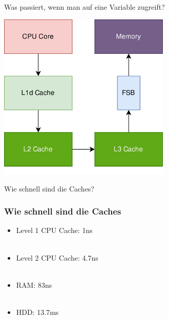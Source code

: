 \documentclass{beamer}
\begin{document}
%
\begin{frame}{Was passiert, wenn man auf eine Variable zugreift?}
\vspace*{0.5cm}
\centerline{\includegraphics[height=8cm]{trace6.png}}
\end{frame}

\begin{frame}
\centering
\Huge
    Wie schnell sind die Caches?
\end{frame}


\begin{frame}
\frametitle{Wie schnell sind die Caches}
\begin{itemize}
    \item Level 1 CPU Cache: 1ns
    \\~\\\pause
    \item Level 2 CPU Cache: 4.7ns
    \\~\\\pause
    \item RAM: 83ns
    \\~\\\pause
    \item HDD: 13.7ms
\end{itemize}
\end{frame}
\end{document}
